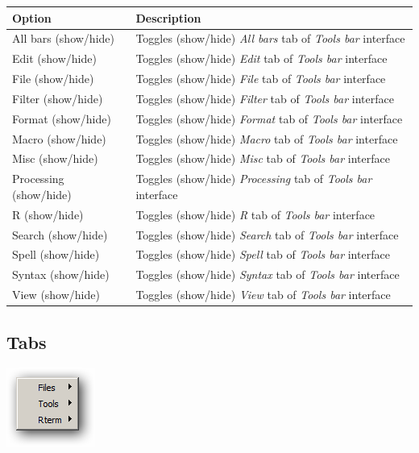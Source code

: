 \begin{scriptsize}\begin{tabularx}{\textwidth}{>{\hsize=0.3\hsize}X>{\hsize=0.7\hsize}X}\\
    \hline
    \textbf{Option} & \textbf{Description} \\
    \hline
    All bars (show/hide) & Toggles (show/hide) \textit{All bars} tab of \textit{Tools bar} interface \\
    Edit (show/hide) & Toggles (show/hide) \textit{Edit} tab of \textit{Tools bar} interface \\
    File (show/hide) & Toggles (show/hide) \textit{File} tab of \textit{Tools bar} interface \\
    Filter (show/hide) & Toggles (show/hide) \textit{Filter} tab of \textit{Tools bar} interface \\
    Format (show/hide) & Toggles (show/hide) \textit{Format} tab of \textit{Tools bar} interface \\
    Macro (show/hide) & Toggles (show/hide) \textit{Macro} tab of \textit{Tools bar} interface \\
    Misc (show/hide) & Toggles (show/hide) \textit{Misc} tab of \textit{Tools bar} interface \\
    Processing (show/hide) & Toggles (show/hide) \textit{Processing} tab of \textit{Tools bar} interface \\
    R (show/hide) & Toggles (show/hide) \textit{R} tab of \textit{Tools bar} interface \\
    Search (show/hide) & Toggles (show/hide) \textit{Search} tab of \textit{Tools bar} interface \\
    Spell (show/hide) & Toggles (show/hide) \textit{Spell} tab of \textit{Tools bar} interface \\
    Syntax (show/hide) & Toggles (show/hide) \textit{Syntax} tab of \textit{Tools bar} interface \\
    View (show/hide) & Toggles (show/hide) \textit{View} tab of \textit{Tools bar} interface \\
    \hline
  \end{tabularx}\end{scriptsize}


\hypertarget{menu_view_tabs}{}
\subsection{Tabs}

\includegraphics[scale=0.50]{./res/menu_view_tabs.png}\\

